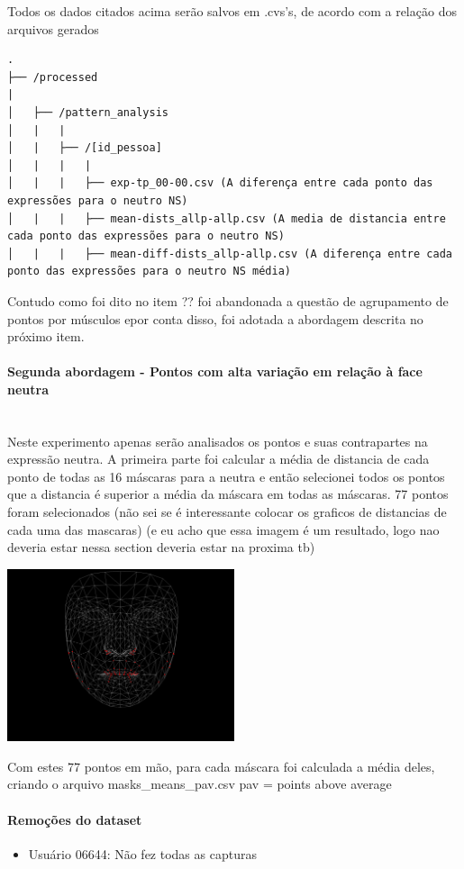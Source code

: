 Todos os dados citados acima serão salvos em .cvs's, de acordo com a relação dos arquivos gerados
\begin{verbatim}
.
├── /processed
|
│   ├── /pattern_analysis
│   |   |
│   |   ├── /[id_pessoa]
│   |   |   |
│   |   |   ├── exp-tp_00-00.csv (A diferença entre cada ponto das expressões para o neutro NS)
│   |   |   ├── mean-dists_allp-allp.csv (A media de distancia entre cada ponto das expressões para o neutro NS)
│   |   |   ├── mean-diff-dists_allp-allp.csv (A diferença entre cada ponto das expressões para o neutro NS média)
\end{verbatim}
Contudo como foi dito no item ?? foi abandonada a questão de agrupamento de pontos por músculos epor conta disso, foi adotada a abordagem descrita no próximo item.

\paragraph{Segunda abordagem - Pontos com alta variação em relação à face neutra}\mbox{}\\
Neste experimento apenas serão analisados os pontos e suas contrapartes na expressão neutra. A primeira parte foi calcular a média de distancia de cada ponto de todas as 16 máscaras para a neutra e então selecionei todos os pontos que a distancia é superior a média da máscara em todas as máscaras. 77 pontos foram selecionados
\newline
(não sei se é interessante colocar os graficos de distancias de cada uma das mascaras)
(e eu acho que essa imagem é um resultado, logo nao deveria estar nessa section deveria estar na proxima tb)

\includegraphics[width=0.5\textwidth]{images/pav_mask.png}

Com estes 77 pontos em mão, para cada máscara foi calculada a média deles, criando o arquivo masks\_means\_pav.csv
pav = points above average

\paragraph{Remoções do dataset}
\begin{itemize}
    \item {Usuário 06644: Não fez todas as capturas}
\end{itemize}



